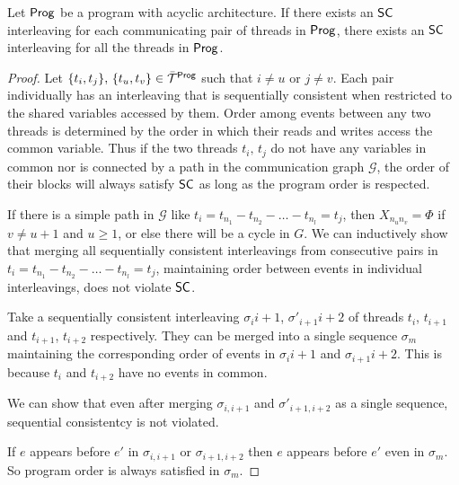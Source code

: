 \begin{lemma}
Let $\mathsf{Prog}$ be a program with acyclic architecture. If there exists an $\mathsf{SC}$ interleaving for each communicating pair of threads in $\mathsf{Prog}$, there exists an $\mathsf{SC}$ interleaving for all the threads in $\mathsf{Prog}$. 
\end{lemma}
\begin{proof}
 Let $\{t_i,t_j\},\,\{t_u,t_v\} \in \bar{{\mathcal T}}^{\mathsf{Prog}}$ such that $i \neq u$ or $j \neq v$. Each pair  individually has an interleaving that is sequentially consistent when restricted to the shared variables accessed by them. 
 Order among events between any two threads is determined by the order in which their reads and writes access the common variable. Thus if the two threads $t_i,\, t_j$ do not have any variables in common nor is connected by a path in the communication graph $\mathcal{G}$, the order of their blocks will always satisfy $\mathsf{SC}$ as long as the  program order is respected. 
 
 If there is a simple path in $\mathcal{G}$ like $t_i= t_{n_1}- t_{n_2}- \dots - t_{n_l}=t_j$, then $X_{n_u n_v}=\Phi$ if $v\neq u+1$ and $u \geq 1$, or else there will be a cycle in $G$. We can inductively show that merging all sequentially consistent interleavings from consecutive pairs in $t_i= t_{n_1}- t_{n_2}- \dots - t_{n_l}=t_j$, maintaining order between events in individual interleavings, does not violate $\mathsf{SC}$. 
 
 
 Take a sequentially consistent interleaving $\sigma_{i}{i+1}$, $\sigma'_{i+1}{i+2}$ of threads $t_i$, $t_{i+1}$ and $t_{i+1}$, $t_{i+2}$ respectively. They can be merged into a single sequence $\sigma_m$ maintaining  the corresponding order of events in $\sigma_{i}{i+1}$ and $\sigma_{i+1}{i+2}$. This is because $t_i$ and $t_{i+2}$ have no events in common. 
 
 
  We can show that even after merging  $\sigma_{{i},{i+1}}$ and $\sigma'_{{i+1},{i+2}}$ as a single sequence,  sequential consistentcy is not violated.  
  
If $e$ appears before $e'$ in $\sigma_{{i},{i+1}}$ or $\sigma_{{i+1},{i+2}}$ then $e$ appears before $e'$ even in $\sigma_m$. So program order is always satisfied in $\sigma_m$.  


\end{proof}
